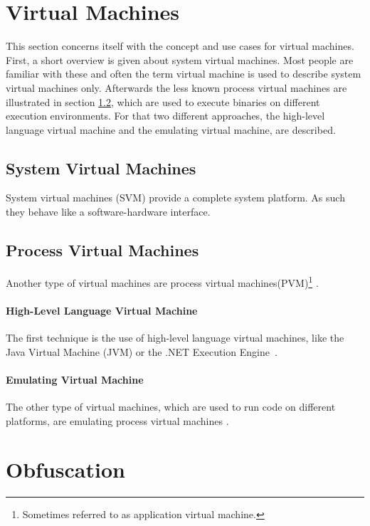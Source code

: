 \documentclass[10pt,twoside,a4paper,bibliography=totoc]{scrbook}
\begin{document}
\section{Virtual Machines}
\label{sec2:virtma}
This section concerns itself with the concept and use cases for virtual machines.
First, a short overview is given about system virtual machines. Most people are familiar with these and often the term virtual machine is used to describe system virtual machines only.
Afterwards the less known process virtual machines are illustrated in section \ref{sec2:procvm}, which are used
to execute binaries on different execution environments.
For that two different approaches, the high-level language virtual machine and the emulating virtual machine, are described.

\subsection{System Virtual Machines}
\label{sec2:sysvm}
System virtual machines (SVM) provide a complete system platform. As such they behave like a software-hardware interface.

\subsection{Process Virtual Machines}
\label{sec2:procvm}
Another type of virtual machines are process virtual machines(PVM)\footnote{Sometimes referred to as application virtual machine.} \cite{virtbo}.

\paragraph*{High-Level Language Virtual Machine}
The first technique is the use of high-level language virtual machines, like the Java Virtual Machine (JVM) or the .NET Execution Engine~\cite{compvirt}.

\paragraph*{Emulating Virtual Machine}
The other type of virtual machines, which are used to run code on different platforms, are emulating process virtual machines \cite{virtbo}.

\section{Obfuscation}
\label{sec2:obfus}
\end{document}
